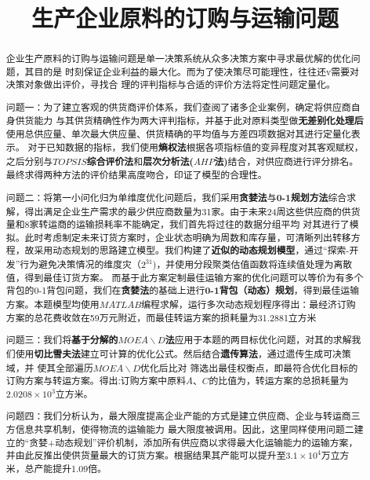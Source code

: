 \documentclass[withoutpreface,bwprint]{cumcmthesis}
\title{生产企业原料的订购与运输问题}\tihao{A}
\begin{document}
\maketitle

\begin{abstract}
    企业生产原料的订购与运输问题是单一决策系统从众多决策方案中寻求最优解的优化问题，其目的是
    时刻保证企业利益的最大化。而为了使决策尽可能理性，往往还v需要对决策对象做出评价，寻找合
    理的评判指标与合适的评价方法将定性问题定量化。


    问题一：为了建立客观的供货商评价体系，我们查阅了诸多企业案例，确定将供应商自身供货能力
    与其供货精确性作为两大评判指标，并基于此对原料类型做\textbf{无差别化处理后}使用总供应量、单次最大供应量、供货精确的平均值与方差四项数据对其进行定量化表示。
    对于已知数据的指标，我们使用\textbf{熵权法}根据各项指标值的变异程度对其客观赋权，之后分别与\textbf{$TOPSIS$综合评价法}和\textbf{层次分析法($AHP$法)}结合，对供应商进行评分排名。
    最终求得两种方法的评价结果高度吻合，印证了模型的合理性。


    问题二：将第一小问化归为单维度优化问题后，我们采用\textbf{贪婪法}与\textbf{0-1规划方法}综合求解，得出满足企业生产需求的最少供应商数量为31家。由于未来24周这些供应商的供货量和8家转运商的运输损耗率不能确定，我们首先将过往的数据分组平均
    对其进行了模拟。此时考虑制定未来订货方案时，企业状态明确为周数和库存量，可清晰列出转移方程，故采用动态规划的思路建立模型。我们构建了\textbf{近似的动态规划模型}，通过“探索-开发”行为避免决策情况的维度灾（$2^{31}$)，并使用分段聚类估值函数将连续值处理为离散值，得到最佳订货方案。
    而基于此方案定制最佳运输方案的优化问题可以等价为有多个背包的0-1背包问题，我们在\textbf{贪婪法}的基础上进行\textbf{0-1背包（动态）规划}，得到最佳运输方案。本题模型均使用$MATLAB$编程求解，运行多次动态规划程序得出：最经济订购方案的总花费收敛在59万元附近，而最佳转运方案的损耗量为31.2881立方米


    问题三：我们将\textbf{基于分解的$MOEA\backslash D$\cite{RN13}法}应用于本题的两目标优化问题，对其的求解我们使用\textbf{切比雪夫法}建立可计算的优化公式。然后结合\textbf{遗传算法}，通过遗传生成可决策域，并 使其全部遍历$MOEA\backslash D$优化后比对
    筛选出最佳权衡点，即最符合优化目标的订购方案与转运方案。得出:订购方案中原料$A$、$C$的比值为，转运方案的总损耗量为$2.0208 \times 10^ 3$立方米。


    问题四：我们分析认为，最大限度提高企业产能的方式是建立供应商、企业与转运商三方信息共享机制，使得物流的运输能力
    最大限度被调用。因此，这里同样使用问题二建立的“贪婪+动态规划”评价机制，添加所有供应商以求得最大化运输能力的运输方案，
    并由此反推出使供货量最大的订货方案。根据结果其产能可以提升至$3.1 \times 10^ 4$万立方米，总产能提升1.09倍。
\end{abstract}
\end{document}
